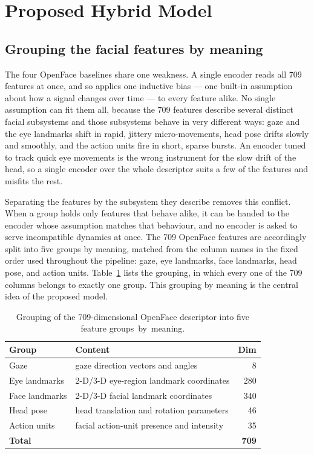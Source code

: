\documentclass[../main.tex]{subfiles}
\begin{document}
\FloatBarrier
\section{Proposed Hybrid Model}
\label{sec:hybrid}

\subsection{Grouping the facial features by meaning}
\label{sec:groups}

The four OpenFace baselines share one weakness. A single encoder reads all 709 features at once, and so applies one inductive bias --- one built-in assumption about how a signal changes over time --- to every feature alike. No single assumption can fit them all, because the 709 features describe several distinct facial subsystems and those subsystems behave in very different ways: gaze and the eye landmarks shift in rapid, jittery micro-movements, head pose drifts slowly and smoothly, and the action units fire in short, sparse bursts. An encoder tuned to track quick eye movements is the wrong instrument for the slow drift of the head, so a single encoder over the whole descriptor suits a few of the features and misfits the rest.

Separating the features by the subsystem they describe removes this conflict. When a group holds only features that behave alike, it can be handed to the encoder whose assumption matches that behaviour, and no encoder is asked to serve incompatible dynamics at once. The 709 OpenFace features are accordingly split into five groups by meaning, matched from the column names in the fixed order used throughout the pipeline: gaze, eye landmarks, face landmarks, head pose, and action units. Table~\ref{tab:groups} lists the grouping, in which every one of the 709 columns belongs to exactly one group. This grouping by meaning is the central idea of the proposed model.

\begin{table}[ht]
\centering
\caption{Grouping of the 709-dimensional OpenFace descriptor into five feature groups~by~meaning.}
\label{tab:groups}
\begin{tabular}{llr}
\toprule
Group & Content & Dim \\
\midrule
Gaze          & gaze direction vectors and angles            & 8   \\
Eye landmarks & 2-D/3-D eye-region landmark coordinates        & 280 \\
Face landmarks& 2-D/3-D facial landmark coordinates            & 340 \\
Head pose     & head translation and rotation parameters      & 46  \\
Action units  & facial action-unit presence and intensity     & 35  \\
\midrule
\textbf{Total} & & \textbf{709} \\
\bottomrule
\end{tabular}
\end{table}
\end{document}
